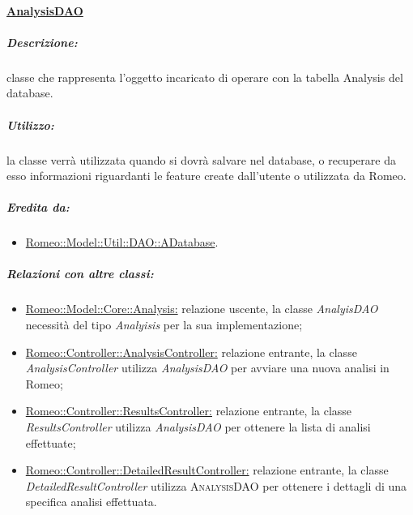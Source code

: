 	\paragraph{\underline{AnalysisDAO}}
	\label{dao::analysisdao} 
					\subparagraph{Descrizione:}  classe che rappresenta l’oggetto incaricato di operare con la tabella Analysis del database.
							
					\subparagraph{Utilizzo:} la classe verrà utilizzata quando si dovrà salvare nel database, o recuperare da esso informazioni riguardanti le feature\g{} create dall'utente o utilizzata da Romeo\g{}.				
													
					\subparagraph{Eredita da:}
						\begin{itemize}
							\item \hyperref[romeo::model::util::dao]{Romeo::Model::Util::DAO::ADatabase}.			
						\end{itemize}
									
					\subparagraph{Relazioni con altre classi:}
						\begin{itemize}
							
							\item \hyperref[]{Romeo::Model::Core::Analysis:} relazione uscente, la classe \textsl{AnalyisDAO} necessità del tipo \textsl{Analyisis} per la sua implementazione;
													
							\item \hyperref[]{Romeo::Controller::AnalysisController:} relazione entrante, la classe \textsl{AnalysisController} utilizza \textsl{AnalysisDAO} per avviare una nuova analisi in Romeo\g{};
							
							\item \hyperref[]{Romeo::Controller::ResultsController:} relazione entrante, la classe \textsl{ResultsController} utilizza \textsl{AnalysisDAO} per ottenere la lista di analisi effettuate;
							
							\item \hyperref[]{Romeo::Controller::DetailedResultController:} relazione entrante, la classe \textsl{DetailedResultController} utilizza \textsc{AnalysisDAO} per ottenere i dettagli di una specifica analisi effettuata.						
		
						\end{itemize}
					










